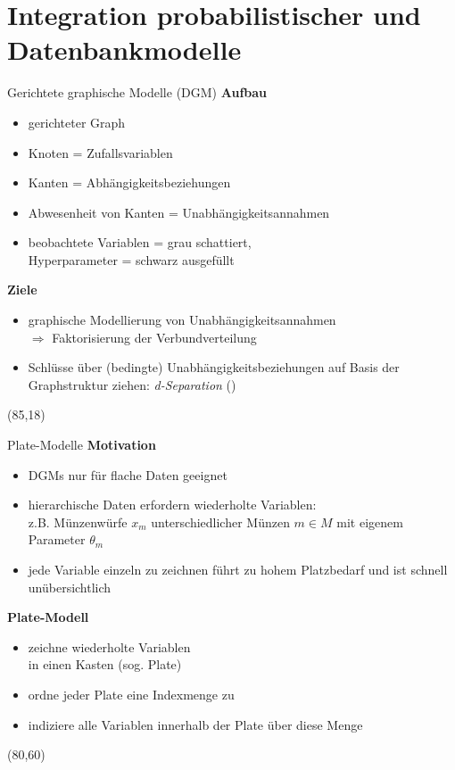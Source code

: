 \documentclass{beamer}
\newcommand{\adjustTikzSize}[0]{\Large}
\newcommand{\tikzScale}[0]{0.55}
\newcommand{\scite}[1]{ {\scriptsize \textcolor{cgray}{(\cite{#1})}} }
\begin{document}
\section{Integration probabilistischer und Datenbankmodelle}
\begin{frame}{Gerichtete graphische Modelle (DGM)}
\textbf{Aufbau}
\begin{itemize}
\item gerichteter Graph
\item Knoten = Zufallsvariablen
\item Kanten = Abhängigkeitsbeziehungen
\item Abwesenheit von Kanten = Unabhängigkeitsannahmen
\item beobachtete Variablen = grau schattiert,\\Hyperparameter = schwarz ausgefüllt
\end{itemize}

\textbf{Ziele}
\begin{itemize}
\item graphische Modellierung von Unabhängigkeitsannahmen\\$\Rightarrow$ Faktorisierung der Verbundverteilung
\item Schlüsse über (bedingte) Unabhängigkeitsbeziehungen auf Basis der Graphstruktur ziehen: \emph{d-Separation}\scite{pearl1988probabilistic}
\end{itemize}

\begin{textblock}{10}(85,18)
	\scalebox{\tikzScale}{\adjustTikzSize }
\end{textblock}
\end{frame}

\begin{frame}{Plate-Modelle}
\textbf{Motivation}
\begin{itemize}
\item DGMs nur für flache Daten geeignet
\item hierarchische Daten erfordern wiederholte Variablen:\\
z.B. Münzenwürfe $x_m$ unterschiedlicher Münzen $m \in M$ mit eigenem Parameter $\theta_m$
\item jede Variable einzeln zu zeichnen führt zu hohem Platzbedarf und ist schnell unübersichtlich
\end{itemize}

\vspace*{0.5em}
\textbf{Plate-Modell}
\begin{itemize}
\item zeichne wiederholte Variablen\\ in einen Kasten (sog. Plate)
\item ordne jeder Plate eine Indexmenge zu
\item indiziere alle Variablen innerhalb der Plate über diese Menge
\end{itemize}

\begin{textblock}{10}(80,60)
	\scalebox{\tikzScale}{\adjustTikzSize }
\end{textblock}
\end{frame}
\end{document}
